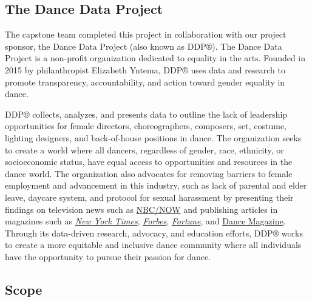 \documentclass[Dance Data
Project,article,submit,moreauthors,pdftex]{mdpi}
\begin{document}
\hypertarget{the-dance-data-project}{%
\subsection{The Dance Data Project}\label{the-dance-data-project}}

The capstone team completed this project in collaboration with our
project sponsor, the Dance Data Project (also known as DDP®). The Dance
Data Project is a non-profit organization dedicated to equality in the
arts. Founded in 2015 by philanthropist Elizabeth Yntema, DDP® uses data
and research to promote transparency, accountability, and action toward
gender equality in dance.

DDP® collects, analyzes, and presents data to outline the lack of
leadership opportunities for female directors, choreographers,
composers, set, costume, lighting designers, and back-of-house positions
in dance. The organization seeks to create a world where all dancers,
regardless of gender, race, ethnicity, or socioeconomic status, have
equal access to opportunities and resources in the dance world. The
organization also advocates for removing barriers to female employment
and advancement in this industry, such as lack of parental and elder
leave, daycare system, and protocol for sexual harassment by presenting
their findings on television news such as
\href{https://www.youtube.com/watch?t=2532\&v=eWL_r5Gq2Vk\&feature=youtu.be}{NBC/NOW}
and publishing articles in magazines such as
\href{https://www.nytimes.com/2022/01/21/arts/dance/gender-gap-ballet.html}{\emph{New
York Times}},
\href{https://www.forbes.com/sites/kimelsesser/2019/09/12/a-gender-gap-in-ballet-seriously/?sh=7b9f066d2be6}{\emph{Forbes}},
\href{https://fortune.com/2022/01/25/board-diversity-cant-find-women-pipeline-problem/}{\emph{Fortune}},
and
\href{https://www.dancemagazine.com/with-its-free-raising-the-barre-curriculum-dance-data-project-aims-to-get-more-women-into-leadership-positions/}{Dance
Magazine}. Through its data-driven research, advocacy, and education
efforts, DDP® works to create a more equitable and inclusive dance
community where all individuals have the opportunity to pursue their
passion for dance.

\hypertarget{scope}{%
\subsection{Scope}\label{scope}}
\end{document}
